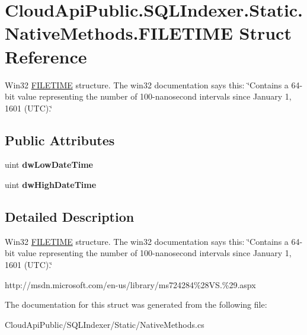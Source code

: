 \hypertarget{struct_cloud_api_public_1_1_s_q_l_indexer_1_1_static_1_1_native_methods_1_1_f_i_l_e_t_i_m_e}{\section{Cloud\-Api\-Public.\-S\-Q\-L\-Indexer.\-Static.\-Native\-Methods.\-F\-I\-L\-E\-T\-I\-M\-E Struct Reference}
\label{struct_cloud_api_public_1_1_s_q_l_indexer_1_1_static_1_1_native_methods_1_1_f_i_l_e_t_i_m_e}
}


Win32 \hyperlink{struct_cloud_api_public_1_1_s_q_l_indexer_1_1_static_1_1_native_methods_1_1_f_i_l_e_t_i_m_e}{F\-I\-L\-E\-T\-I\-M\-E} structure. The win32 documentation says this\-: \char`\"{}\-Contains a 64-\/bit value representing the number of 100-\/nanosecond intervals since January 1, 1601 (\-U\-T\-C).\char`\"{}  


\subsection*{Public Attributes}
\begin{DoxyCompactItemize}
\item 
\hypertarget{struct_cloud_api_public_1_1_s_q_l_indexer_1_1_static_1_1_native_methods_1_1_f_i_l_e_t_i_m_e_a72623f3c5fa6769d3e80ebf61455b02b}{uint {\bfseries dw\-Low\-Date\-Time}}\label{struct_cloud_api_public_1_1_s_q_l_indexer_1_1_static_1_1_native_methods_1_1_f_i_l_e_t_i_m_e_a72623f3c5fa6769d3e80ebf61455b02b}

\item 
\hypertarget{struct_cloud_api_public_1_1_s_q_l_indexer_1_1_static_1_1_native_methods_1_1_f_i_l_e_t_i_m_e_a763bb5c26796f77c015ef7f345821093}{uint {\bfseries dw\-High\-Date\-Time}}\label{struct_cloud_api_public_1_1_s_q_l_indexer_1_1_static_1_1_native_methods_1_1_f_i_l_e_t_i_m_e_a763bb5c26796f77c015ef7f345821093}

\end{DoxyCompactItemize}


\subsection{Detailed Description}
Win32 \hyperlink{struct_cloud_api_public_1_1_s_q_l_indexer_1_1_static_1_1_native_methods_1_1_f_i_l_e_t_i_m_e}{F\-I\-L\-E\-T\-I\-M\-E} structure. The win32 documentation says this\-: \char`\"{}\-Contains a 64-\/bit value representing the number of 100-\/nanosecond intervals since January 1, 1601 (\-U\-T\-C).\char`\"{} 

http\-://msdn.\-microsoft.\-com/en-\/us/library/ms724284\%28\-V\-S.\%29.\-aspx 

The documentation for this struct was generated from the following file\-:\begin{DoxyCompactItemize}
\item 
Cloud\-Api\-Public/\-S\-Q\-L\-Indexer/\-Static/Native\-Methods.\-cs\end{DoxyCompactItemize}
